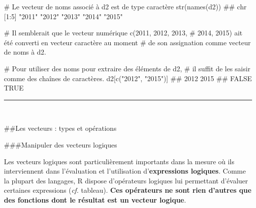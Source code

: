\documentclass[12pt,twosided, notitlepage]{book}
\newenvironment{Shaded}{}{}
\newcommand{\CommentTok}[1]{\textcolor[rgb]{0.00,0.50,0.00}{#1}}
\newcommand{\KeywordTok}[1]{\textcolor[rgb]{0.00,0.00,1.00}{#1}}
\newcommand{\NormalTok}[1]{#1}
\newcommand{\StringTok}[1]{\textcolor[rgb]{0.00,0.50,0.50}{#1}}
\renewenvironment{Shaded}{\begin{snugshade}}{\end{snugshade}}
\begin{document}
\begin{enumerate}
\begin{Shaded}
\begin{Highlighting}[]
\CommentTok{# Le vecteur de noms associé à d2 est de type caractère}
\KeywordTok{str}\NormalTok{(}\KeywordTok{names}\NormalTok{(d2))}
\NormalTok{  ##  chr [1:5] "2011" "2012" "2013" "2014" "2015"}

\CommentTok{# Il semblerait que le vecteur numérique c(2011, 2012, 2013, }
\CommentTok{# 2014, 2015) ait été converti en vecteur caractère au moment }
\CommentTok{# de son assignation comme vecteur de noms à d2. }

\CommentTok{# Pour utiliser des noms pour extraire des éléments de d2,}
\CommentTok{# il suffit de les saisir comme des chaînes de caractères.}
\NormalTok{d2[}\KeywordTok{c}\NormalTok{(}\StringTok{"2012"}\NormalTok{, }\StringTok{"2015"}\NormalTok{)]}
\NormalTok{  ##  2012  2015 }
\NormalTok{  ## FALSE  TRUE}
\end{Highlighting}
\end{Shaded}

  \begin{center} \rule{0.5\linewidth}{\linethickness}\end{center} 
    \bigskip 
    \fi
\end{enumerate}

~

\#\#Les vecteurs : types et opérations

\#\#\#Manipuler des vecteurs logiques

Les vecteurs logiques sont particulièrement importants dans la mesure où
ils interviennent dans l'évaluation et l'utilisation
d'\textbf{expressions logiques}. Comme la plupart des langages, R
dispose d'opérateurs logiques lui permettant d'évaluer certaines
expressions (\emph{cf.} tableau). \textbf{Ces opérateurs ne sont rien
d'autres que des fonctions dont le résultat est un vecteur logique}.
\end{document}
